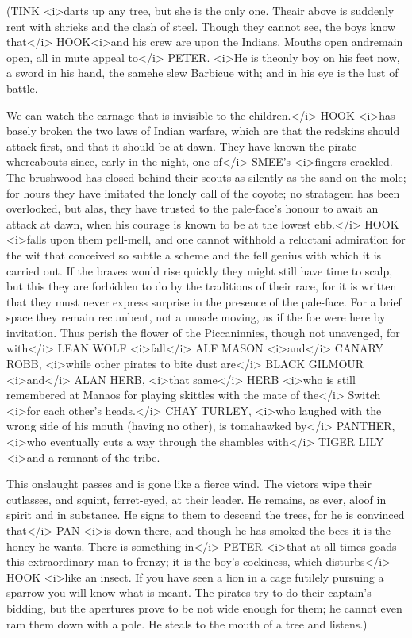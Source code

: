 \begin{stagedir}
(TINK <i>darts up any tree, but she is the only one. Theair above is suddenly rent with shrieks and the clash of steel. Though they cannot see, the boys know that</i> HOOK<i>and his crew are upon the Indians. Mouths open andremain open, all in mute appeal to</i> PETER. <i>He is theonly boy on his feet now, a sword in his hand, the samehe slew Barbicue with; and in his eye is the lust of battle.

We can watch the carnage that is invisible to the children.</i> HOOK <i>has basely broken the two laws of Indian warfare, which are that the redskins should attack first, and that it should be at dawn. They have known the pirate whereabouts since, early in the night, one of</i> SMEE's <i>fingers crackled. The brushwood has closed behind their scouts as silently as the sand on the mole; for hours they have imitated the lonely call of the coyote; no stratagem has been overlooked, but alas, they have trusted to the pale-face's honour to await an attack at dawn, when his courage is known to be at the lowest ebb.</i> HOOK <i>falls upon them pell-mell, and one cannot withhold a reluctani admiration for the wit that conceived so subtle a scheme and the fell genius with which it is carried out. If the braves would rise quickly they might still have time to scalp, but this they are forbidden to do by the traditions of their race, for it is written that they must never express surprise in the presence of the pale-face. For a brief space they remain recumbent, not a muscle moving, as if the foe were here by invitation. Thus perish the flower of the Piccaninnies, though not unavenged, for with</i> LEAN WOLF <i>fall</i> ALF MASON <i>and</i> CANARY ROBB, <i>while other pirates to bite dust are</i> BLACK GILMOUR <i>and</i> ALAN HERB, <i>that same</i> HERB <i>who is still remembered at Manaos for playing skittles with the mate of the</i> Switch <i>for each other's heads.</i> CHAY TURLEY, <i>who laughed with the wrong side of his mouth (having no other), is tomahawked by</i> PANTHER, <i>who eventually cuts a way through the shambles with</i> TIGER LILY <i>and a remnant of the tribe.

This onslaught passes and is gone like a fierce wind. The victors wipe their cutlasses, and squint, ferret-eyed, at their leader. He remains, as ever, aloof in spirit and in substance. He signs to them to descend the trees, for he is convinced that</i> PAN <i>is down there, and though he has smoked the bees it is the honey he wants. There is something in</i> PETER <i>that at all times goads this extraordinary man to frenzy; it is the boy's cockiness, which disturbs</i> HOOK <i>like an insect. If you have seen a lion in a cage futilely pursuing a sparrow you will know what is meant. The pirates try to do their captain's bidding, but the apertures prove to be not wide enough for them; he cannot even ram them down with a pole. He steals to the mouth of a tree and listens.)
\end{stagedir}

